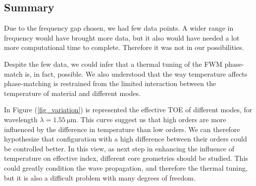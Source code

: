 \documentclass[12pt,a4paper,twoside]{article}
\begin{document}
\subsection{Summary}
Due to the frequency gap chosen, we had few data points.
A wider range in frequency would have brought more data, but it also would have needed a lot more computational time to complete.
Therefore it was not in our possibilities.

Despite the few data, we could infer that a thermal tuning of the FWM phase-match is, in fact, possible.
We also understood that the way temperature affects phase-matching is restrained from the limited interaction between the temperature of material and different modes.

In Figure (\ref{fig_variation}) is represented the effective TOE of different modes, for wavelength $\lambda = \SI{1.55}{\um}$.
This curve suggest us that high orders are more influenced by the difference in temperature than low orders.
We can therefore hypothesize that configuration with a high difference between their orders could be controlled better.
In this view, as next step in enhancing the influence of temperature on effective index, different core geometries should be studied.
This could greatly condition the wave propagation, and therefore the thermal tuning, but it is also a difficult problem with many degrees of freedom.
\end{document}
